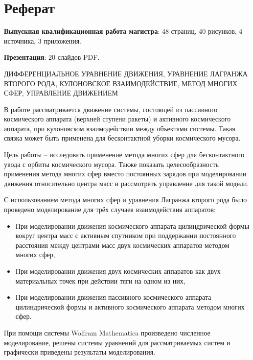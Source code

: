\section*{Реферат}
\textbf{Выпускная квалификационная работа магистра}: 48 страниц, 40 рисунков, 4 источника, 3 приложения. 

\textbf{Презентация}: 20 слайдов PDF.

\hspace{1pt}

ДИФФЕРЕНЦИАЛЬНОЕ УРАВНЕНИЕ ДВИЖЕНИЯ, УРАВНЕНИЕ ЛАГРАНЖА ВТОРОГО РОДА, КУЛОНОВСКОЕ ВЗАИМОДЕЙСТВИЕ, МЕТОД МНОГИХ СФЕР, УПРАВЛЕНИЕ ДВИЖЕНИЕМ

\hspace{1pt}

В работе рассматривается движение системы, состоящей из пассивного космического аппарата (верхней ступени ракеты) и активного космического аппарата, при кулоновском взаимодействии между объектами системы.
Такая связка может быть применена для бесконтактной уборки космического мусора.

Цель работы – исследовать применение метода многих сфер  для бесконтактного увода с орбиты космического мусора.
Также показать целесообразность применения метода многих сфер вместо постоянных зарядов при моделировании движения относительно центра масс и рассмотреть управление для такой модели.

С использованием метода многих сфер и уравнения Лагранжа второго рода было проведено моделирование для трёх случаев взаимодействия аппаратов:
\begin{itemize}
	\item При моделировании движения космического аппарата цилиндрической формы вокруг центра масс с активным спутником при поддержании постоянного расстояния между центрами масс двух космических аппаратов методом многих сфер,
	\item При моделировании движения двух космических аппаратов как двух материальных точек при действии тяги на одном из них,
	\item При моделировании движения пассивного космического аппарата цилиндрической формы и активного космического аппарата методом многих сфер.
\end{itemize}
При помощи системы Wolfram Mathematica произведено численное моделирование, решены системы уравнений для рассматриваемых систем и графически приведены результаты моделирования.
